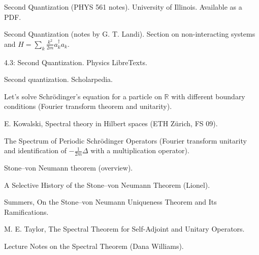 \documentclass[11pt]{article}
\theoremstyle{definition}
\theoremstyle{plain}
\numberwithin{equation}{section}
\begin{document}
\bigskip

\begin{thebibliography}{9}

Second Quantization (PHYS 561 notes). University of Illinois. Available as a PDF. 

Second Quantization (notes by G. T. Landi). Section on non-interacting systems and $H=\sum_k \frac{k^2}{2m} a_k^\dagger a_k$.

4.3: Second Quantization. Physics LibreTexts.

Second quantization. Scholarpedia.

Let's solve Schrödinger's equation for a particle on $\mathbb{R}$ with different boundary conditions (Fourier transform theorem and unitarity).

E. Kowalski, Spectral theory in Hilbert spaces (ETH Z\"urich, FS 09).

The Spectrum of Periodic Schr\"odinger Operators (Fourier transform unitarity and identification of $-\frac{1}{2m}\Delta$ with a multiplication operator).

Stone--von Neumann theorem (overview).

A Selective History of the Stone--von Neumann Theorem (Lionel).

Summers, On the Stone--von Neumann Uniqueness Theorem and Its Ramifications.

M. E. Taylor, The Spectral Theorem for Self-Adjoint and Unitary Operators.

Lecture Notes on the Spectral Theorem (Dana Williams).

\end{thebibliography}
\end{document}
